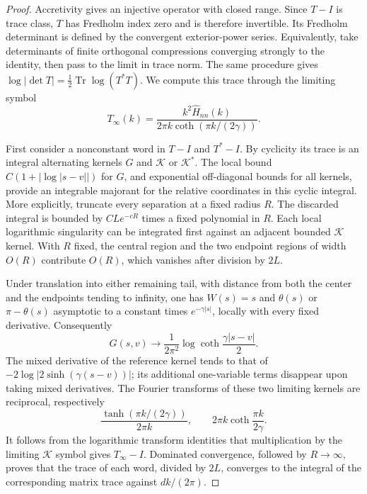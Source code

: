 \begin{proof}
Accretivity gives an injective operator with closed range. Since
\(T-I\) is trace class, \(T\) has Fredholm index zero and is
therefore invertible. Its Fredholm determinant is defined by the convergent exterior-power series.
Equivalently, take determinants of finite orthogonal compressions
converging strongly to the identity, then pass to the limit in trace
norm. The same procedure gives
\(\log|\det T|=\tfrac12\operatorname{Tr}\log(T^*T)\).
We compute this trace through the limiting symbol
\[
 T_\infty(k)=
 \frac{k^2\widehat H_{nn}(k)}
      {2\pi k\coth(\pi k/(2\gamma))}.
\]

First consider a nonconstant word in \(T-I\) and \(T^*-I\).
By cyclicity its trace is an integral alternating kernels
\(G\) and \(\mathscr K\) or \(\mathscr K^*\).
The local bound \(C(1+|\log|s-v||)\) for \(G\), and exponential
off-diagonal bounds for all kernels, provide an integrable majorant
for the relative coordinates in this cyclic integral. More explicitly,
truncate every separation at a fixed radius \(R\). The discarded
integral is bounded by \(CL e^{-cR}\) times a fixed polynomial in
\(R\). Each local logarithmic singularity can be integrated first
against an adjacent bounded \(\mathscr K\) kernel. With \(R\) fixed,
the central region and the two endpoint regions of width \(O(R)\)
contribute \(O(R)\), which vanishes after division by \(2L\).

Under translation into either remaining tail, with distance from both
the center and the endpoints tending to infinity, one has \(W(s)=s\)
and \(\theta(s)\) or \(\pi-\theta(s)\) asymptotic to a constant times
\(e^{-\gamma|s|}\), locally with every fixed derivative. Consequently
\[
 G(s,v)\longrightarrow
       \frac{1}{2\pi^2}\log\coth\frac{\gamma|s-v|}{2}.
\]
The mixed derivative of the reference kernel tends to that of
\(-2\log|2\sinh(\gamma(s-v))|\); its additional one-variable terms
disappear upon taking mixed derivatives. The Fourier transforms of
these two limiting kernels are reciprocal, respectively
\[
 \frac{\tanh(\pi k/(2\gamma))}{2\pi k},
 \qquad 2\pi k\coth\frac{\pi k}{2\gamma}.
\]
It follows from the logarithmic transform identities that multiplication
by the limiting \(\mathscr K\) symbol gives \(T_\infty-I\).
Dominated convergence, followed by \(R\to\infty\), proves that the
trace of each word, divided by \(2L\), converges to the integral of the
corresponding matrix trace against \(dk/(2\pi)\).


\end{proof}
